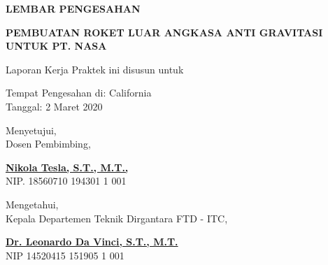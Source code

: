 \begin{center}
  {\Large \textbf{LEMBAR PENGESAHAN}}
  \vspace{6ex}

  {\large \textbf{PEMBUATAN ROKET LUAR ANGKASA ANTI GRAVITASI UNTUK PT. NASA}}
  \vspace{6ex}

  Laporan Kerja Praktek ini disusun untuk \lipsum[1][1]
  \vspace{2ex}

  Tempat Pengesahan di: California \\
  Tanggal: 2 Maret 2020
  \vspace{6ex}

  Menyetujui, \\
  Dosen Pembimbing,
  \vspace{12ex}

  \textbf{\underline{Nikola Tesla, S.T., M.T.,}} \\
  NIP. 18560710 194301 1 001
  \vspace{8ex}

  Mengetahui, \\
  Kepala Departemen Teknik Dirgantara FTD - ITC,
  \vspace{12ex}

  \textbf{\underline{Dr. Leonardo Da Vinci, S.T., M.T.}} \\
  NIP 14520415 151905 1 001

\end{center}